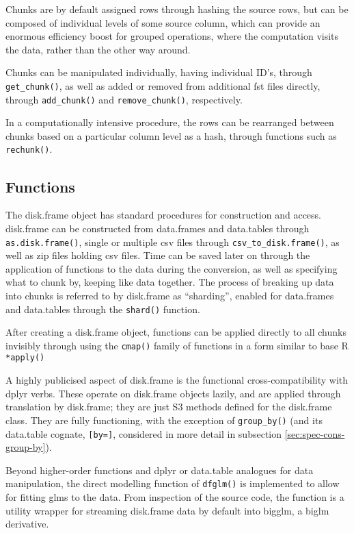 Chunks are by default assigned rows through hashing the source rows, but
can be composed of individual levels of some source column, which can
provide an enormous efficiency boost for grouped operations, where the
computation visits the data, rather than the other way around.

Chunks can be manipulated individually, having individual ID's, through
\texttt{get_chunk()}, as well as added or
removed from additional fst files directly, through
\texttt{add_chunk()} and
\texttt{remove_chunk()}, respectively.

In a computationally intensive procedure, the rows can be rearranged
between chunks based on a particular column level as a hash, through
functions such as \texttt{rechunk()}.

\hypertarget{sec:functions}{%
    \subsection{Functions}\label{sec:functions}}

The disk.frame object has standard procedures for construction and
access. disk.frame can be constructed from data.frames and data.tables
through \texttt{as.disk.frame()}, single or
multiple csv files through
\texttt{csv_to_disk.frame()}, as well as zip
files holding csv files. Time can be saved later on through the
application of functions to the data during the conversion, as well as
specifying what to chunk by, keeping like data together. The process of
breaking up data into chunks is referred to by disk.frame as
``sharding'', enabled for data.frames and data.tables through the
\texttt{shard()} function.

After creating a disk.frame object, functions can be applied directly to
all chunks invisibly through using the
\texttt{cmap()} family of functions in a form
similar to base R \texttt{*apply()}

A highly publicised aspect of disk.frame is the functional
cross-compatibility with dplyr verbs. These operate on disk.frame
objects lazily, and are applied through translation by disk.frame; they
are just S3 methods defined for the disk.frame class. They are fully
functioning, with the exception of \texttt{group_by()} (and its
data.table cognate, \texttt{[by=]}, considered in more detail in
subsection \ref{sec:spec-cons-group-by}).

Beyond higher-order functions and dplyr or data.table analogues for data
manipulation, the direct modelling function of
\texttt{dfglm()} is implemented to allow for
fitting glms to the data. From inspection of the source code, the
function is a utility wrapper for streaming disk.frame data by default
into bigglm, a biglm derivative.

